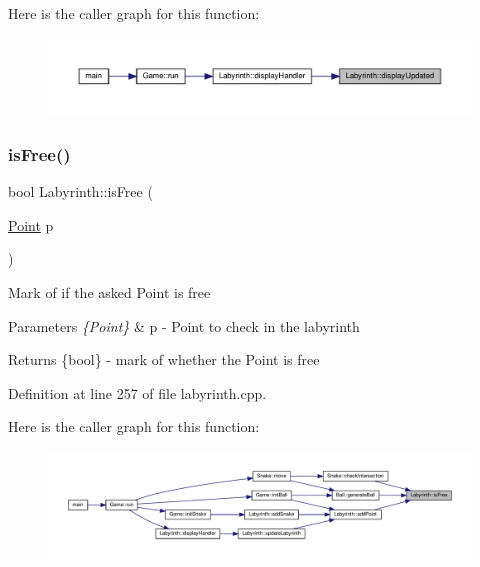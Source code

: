Here is the caller graph for this function\+:
\nopagebreak
\begin{figure}[H]
\begin{center}
\leavevmode
\includegraphics[width=350pt]{class_labyrinth_a86210707e3b4be4faaa9bd1f86429124_icgraph}
\end{center}
\end{figure}
\mbox{\label{class_labyrinth_acd7311e3222304bae2208fbc293bcc4d}} 
\subsubsection{\texorpdfstring{isFree()}{isFree()}}
{\footnotesize\ttfamily bool Labyrinth\+::is\+Free (\begin{DoxyParamCaption}\item[{\mbox{\hyperlink{common_8h_aa9cfdb80b4ca12013a2de8a3b9b97981}{Point}}}]{p }\end{DoxyParamCaption})}

Mark of if the asked Point is free 
\begin{DoxyParams}{Parameters}
{\em \{\+Point\}} & p -\/ Point to check in the labyrinth \\
\hline
\end{DoxyParams}
\begin{DoxyReturn}{Returns}
\{bool\} -\/ mark of whether the Point is free 
\end{DoxyReturn}


Definition at line 257 of file labyrinth.\+cpp.

Here is the caller graph for this function\+:
\nopagebreak
\begin{figure}[H]
\begin{center}
\leavevmode
\includegraphics[width=350pt]{class_labyrinth_acd7311e3222304bae2208fbc293bcc4d_icgraph}
\end{center}
\end{figure}
\mbox{\label{class_labyrinth_a36cd7033292515cba0ce3d74f03720b6}} 
